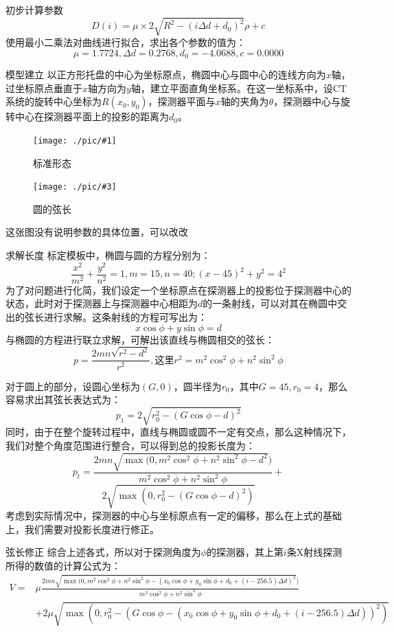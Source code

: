 \documentclass{beamer}
\newcommand{\doublepic}[4]{ \begin{figure}[H]
\begin{minipage}[H]{0.45\textwidth}
\centering
\texttt{[image: ./pic/\#1]}
\caption{#2}
\end{minipage}
\begin{minipage}[H]{0.45\textwidth}
\centering
\texttt{[image: ./pic/\#3]}
\caption{#4}
\end{minipage}
\end{figure}}
\begin{document}
  \begin{frame}{初步计算参数}
    \begin{equation}
      D(i)  = \mu\times 2\sqrt{R^2 - ( i\Delta d + d_0)^2}\rho  +c
      \end{equation}
      使用最小二乘法对曲线进行拟合，求出各个参数的值为：
      \[\mu =1.7724 , \Delta d = 0.2768, d_0 = -4.0688, c = 0.0000\]
  \end{frame}

  \begin{frame}{模型建立}
    以正方形托盘的中心为坐标原点，椭圆中心与圆中心的连线方向为\(x\)轴，过坐标原点垂直于\(x\)轴方向为\(y\)轴，建立平面直角坐标系。在这一坐标系中，设CT系统的旋转中心坐标为\(R(x_0,y_0)\)，探测器平面与\(x\)轴的夹角为\(\theta\)，探测器中心与旋转中心在探测器平面上的投影的距离为\(d_0\)。
  \end{frame}

  \begin{frame}
    \doublepic{q10.png}{标准形态}{q14.png}{圆的弦长}
    这张图没有说明参数的具体位置，可以改改
  \end{frame}

  \begin{frame}{求解长度}
    标定模板中，椭圆与圆的方程分别为：
    \[\frac{x^2}{m^2} + \frac{y^2}{n^2} = 1,m = 15,n = 40;(x - 45)^2 + y^2 = 4^2\]
    为了对问题进行化简，我们设定一个坐标原点在探测器上的投影位于探测器中心的状态，此时对于探测器上与探测器中心相距为\(d\)的一条射线，可以对其在椭圆中交出的弦长进行求解。这条射线的方程可写出为：
    \[x\cos\phi + y\sin\phi = d\]
    与椭圆的方程进行联立求解，可解出该直线与椭圆相交的弦长：
    \[ p = \frac{2mn\sqrt{r^2 - d^2}}{r^2},\text{这里} r^2 = m^2\cos^2\phi + n^2\sin^2\phi\]
  \end{frame}

  \begin{frame}
    对于圆上的部分，设圆心坐标为\((G,0)\)，圆半径为\(r_0\)，其中\(G = 45,r_0 = 4\)，那么容易求出其弦长表达式为：
    \[p_1 = 2\sqrt{r_0^2 - (G\cos\phi - d)^2}\]
    同时，由于在整个旋转过程中，直线与椭圆或圆不一定有交点，那么这种情况下，我们对整个角度范围进行整合，可以得到总的投影长度为：
    \[p_t =  \frac{2mn\sqrt{\max(0,m^2\cos^2\phi + n^2\sin^2\phi - d^2})}{ m^2\cos^2\phi + n^2\sin^2\phi} +\]
    \[2\sqrt{\max(0,r_0^2 - (G\cos\phi - d)^2)}\]
    考虑到实际情况中，探测器的中心与坐标原点有一定的偏移，那么在上式的基础上，我们需要对投影长度进行修正。
  \end{frame}

  \begin{frame}{弦长修正}
    综合上述各式，所以对于探测角度为\(\phi\)的探测器，其上第\(i\)条X射线探测所得的数值的计算公式为：
    \begin{align*}\label{val}
    V = & \mu\frac{2mn\sqrt{\max(0,m^2\cos^2\phi + n^2\sin^2\phi - (x_0\cos\phi + y_0\sin\phi + d_0 +  (i - 256.5)\Delta d)^2})}{ m^2\cos^2\phi + n^2\sin^2\phi} \\
      & + 2\mu\sqrt{\max(0,r_0^2 - (G\cos\phi - (x_0\cos\phi + y_0\sin\phi + d_0 +  (i - 256.5)\Delta d))^2)}
    \end{align*}
  \end{frame}
\end{document}
